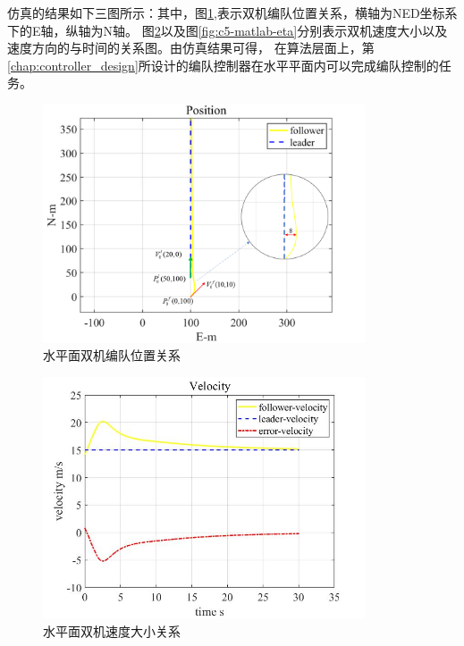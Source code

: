 仿真的结果如下三图所示：其中，图\ref{fig:c5-matlab-pos},表示双机编队位置关系，横轴为NED坐标系下的E轴，纵轴为N轴。
图\ref{fig:c5-matlab-vel}以及图\ref{fig:c5-matlab-eta}分别表示双机速度大小以及速度方向的与时间的关系图。由仿真结果可得，
在算法层面上，第\ref{chap:controller_design}所设计的编队控制器在水平平面内可以完成编队控制的任务。
\begin{figure}[H]
    \centering
    \includegraphics[width=0.85\textwidth]{figures/c5/c5-matlab-pos.png}
    \caption{水平面双机编队位置关系}\label{fig:c5-matlab-pos}
\end{figure}
\begin{figure}[H]
    \centering
    \includegraphics[width=0.85\textwidth]{figures/c5/c5-matlab-vel.jpg}
    \caption{水平面双机速度大小关系}\label{fig:c5-matlab-vel}
\end{figure}
